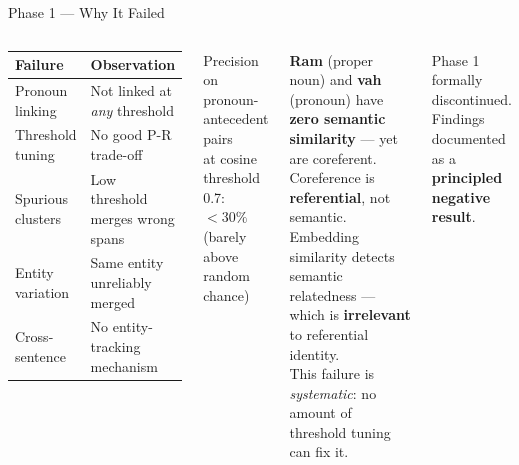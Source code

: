 \documentclass[aspectratio=169]{beamer}
\begin{document}
\begin{frame}{Phase 1 — Why It Failed}
  \begin{columns}[T]
      \begin{tcolorbox}[wbox={Failure Summary}]
        \small
        \renewcommand{\arraystretch}{1.35}
        \begin{tabular}{p{2.6cm} p{3.3cm}}
          \toprule
          \textbf{Failure} & \textbf{Observation}\\
          \midrule
          Pronoun linking & Not linked at \textit{any} threshold\\
          Threshold tuning & No good P-R trade-off\\
          Spurious clusters & Low threshold merges wrong spans\\
          Entity variation & Same entity unreliably merged\\
          Cross-sentence & No entity-tracking mechanism\\
          \bottomrule
        \end{tabular}
      \end{tcolorbox}

      \vspace{6pt}
      \begin{tcolorbox}[nbox={Key Metric}]
        \centering\small
        Precision on pronoun-antecedent pairs\\
        at cosine threshold 0.7:\\[4pt]
        \textcolor{red!70!black}{\Large\textbf{$< 30\%$}}\\[2pt]
        \small (barely above random chance)
      \end{tcolorbox}

      \begin{tcolorbox}[nbox={Root Cause Analysis}]
        \small
        \textbf{Ram} (proper noun) and \textbf{vah} (pronoun)
        have \textcolor{red!70!black}{\textbf{zero semantic similarity}}
        — yet are coreferent.\\[8pt]
        Coreference is \textbf{referential}, not semantic.\\[8pt]
        Embedding similarity detects semantic relatedness —
        which is \textbf{irrelevant} to referential identity.\\[8pt]
        This failure is \textit{systematic}: no amount of
        threshold tuning can fix it.
      \end{tcolorbox}

      \vspace{6pt}
      \begin{tcolorbox}[rbox={Outcome}]
        \small
        Phase 1 formally discontinued.\\
        Findings documented as a\\
        \textbf{principled negative result}.
      \end{tcolorbox}
  \end{columns}
\end{frame}
\end{document}
